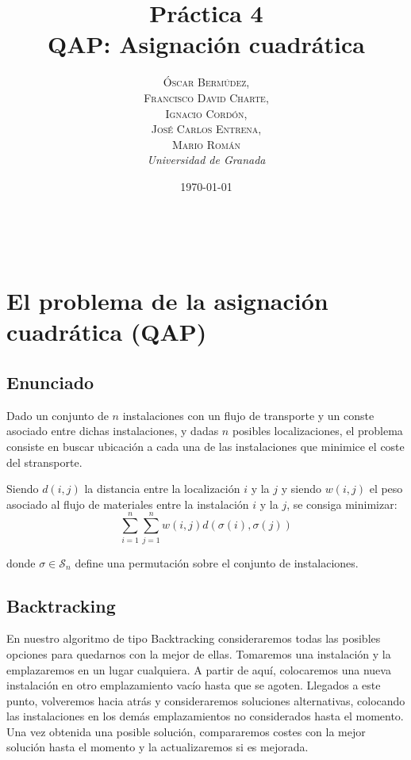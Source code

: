 \documentclass[a4paper, 11pt]{article} %
\title{\textbf{Práctica 4}\\ %
QAP: Asignación cuadrática} %
\author{\textsc{Óscar Bermúdez,\\Francisco David Charte,\\Ignacio Cordón,\\José Carlos Entrena,\\Mario Román} %
\\{\textit{Universidad de Granada}}} %
\date{\today} %
\makeatletter
\renewcommand{\maketitle}{ %
\begin{flushright} %
{\LARGE\@title} %

\vspace{50pt} %

{\large\@author} %
\\\@date %

\vspace{40pt} %
\end{flushright}
}
\makeatother
\begin{document}
\maketitle %

\renewcommand{\abstractname}{Resumen} %
\begin{abstract}
\end{abstract}
{\parskip=2pt
\tableofcontents
}
\pagebreak

  \section{El problema de la asignación cuadrática (QAP)}
    \subsection{Enunciado}
      Dado un conjunto de $n$ instalaciones con un flujo de transporte y
      un conste asociado entre dichas instalaciones, y dadas $n$ posibles localizaciones,
      el problema consiste en buscar ubicación a cada una de las instalaciones que
      minimice el coste del stransporte.
      
      Siendo $d(i,j)$ la distancia entre la localización $i$ y la $j$
      y siendo $w(i,j)$ el peso asociado al flujo de materiales entre la instalación
      $i$ y la $j$, se consiga minimizar:
      \begin{equation}
      \sum_{i=1}^n \sum_{j=1}^nw(i,j) d(\sigma(i),\sigma(j))
      \label{coste}
      \end{equation}

      donde $\sigma \in \mathcal{S}_n$ define una permutación sobre el conjunto de instalaciones.


    \subsection{Backtracking}
      En nuestro algoritmo de tipo Backtracking consideraremos todas las posibles opciones para quedarnos con la mejor de ellas.
      Tomaremos una instalación y la emplazaremos en un lugar cualquiera. A partir de aquí, colocaremos una nueva instalación
      en otro emplazamiento vacío hasta que se agoten. Llegados a este punto, volveremos hacia atrás y consideraremos soluciones
      alternativas, colocando las instalaciones en los demás emplazamientos no considerados hasta el momento. Una vez obtenida una
      posible solución, compararemos costes con la mejor solución hasta el momento y la actualizaremos si es mejorada.       
      
\end{document}
